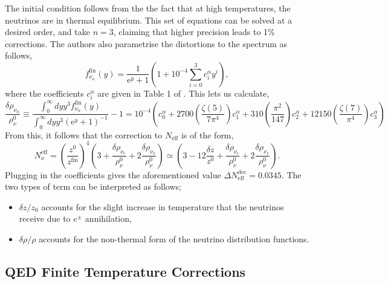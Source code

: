 \documentclass[11pt]{article}
\numberwithin{equation}{section}
\numberwithin{figure}{section}
\numberwithin{table}{section}
\begin{document}
The initial condition follows from the the fact that at high temperatures, the neutrinos are in thermal equilibrium. This set of equations can be solved at a desired order, and \citet{Mangano:2001iu} take $n=3$, claiming that higher precision leads to 1\% corrections. The authors also parametrise the distortions to the spectrum as follows,
\begin{equation}
f_{\nu_{\alpha}}^{\mathrm{fin}}(y)=\frac{1}{\mathrm{e}^{y}+1}\left(1+10^{-4} \sum_{i=0}^{3} c_{i}^{\alpha} y^{i}\right),
\end{equation}
where the coefficients $c_i^{\alpha}$ are given in Table 1 of \citet{Mangano:2001iu}. This lets us calculate,
\begin{equation}
\frac{\delta \rho_{\nu_{\alpha}}}{\rho_{\nu}^{0}} \equiv \frac{\int_{0}^{\infty} d y y^{3} f_{\nu_{\alpha}}^{\mathrm{fin}}(y)}{\int_{0}^{\infty} d y y^{3}\left(\mathrm{e}^{y}+1\right)^{-1}}-1 =10^{-4}\left(c_{0}^{\alpha}+2700\left(\frac{\zeta(5)}{7 \pi^{4}}\right) c_{1}^{\alpha}+310\left(\frac{\pi^{2}}{147}\right) c_{2}^{\alpha}+12150\left(\frac{\zeta(7)}{\pi^{4}}\right) c_{3}^{\alpha}\right)
\end{equation}
From this, it follows that the correction to $N_{\mathrm{eff}}$ is of the form,
\begin{equation}
N_{\nu}^{\mathrm{eff}}=\left(\frac{z^{0}}{z^{\mathrm{fin}}}\right)^{4}\left(3+\frac{\delta \rho_{\nu_{e}}}{\rho_{\nu}^{0}}+2 \frac{\delta \rho_{\nu_{x}}}{\rho_{\nu}^{0}}\right) \simeq\left(3-12 \frac{\delta z}{z^{0}}+\frac{\delta \rho_{\nu_{e}}}{\rho_{\nu}^{0}}+2 \frac{\delta \rho_{\nu_{x}}}{\rho_{\nu}^{0}}\right).
\end{equation}
Plugging in the coefficients gives the aforementioned value $\Delta N^{\mathrm{dec}}_{\mathrm{eff}} = 0.0345$. The two types of term can be interpreted as follows;
\begin{itemize}
\item $\delta z/z_0$ accounts for the slight increase in temperature that the neutrinos receive due to $e^{\pm}$ annihilation,
\item $\delta \rho/\rho$ accounts for the non-thermal form of the neutrino distribution functions.
\end{itemize}


\subsection{QED Finite Temperature Corrections}
\end{document}
